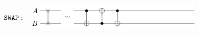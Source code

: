 \documentclass[a4paper,12pt,fleqn]{article}
\newcommand\swap{\mathtt{SWAP}}
\begin{document}
\begin{figure}
  \begin{equation}\label{swap}
    \swap : \ \raisebox{-5mm}{
      \begin{tikzpicture}[scale=1.200000,x=1pt,y=1pt]
\filldraw[color=white] (0.000000, -7.500000) rectangle (180.000000, 22.500000);
\draw[color=black] (0.000000,15.000000) -- (180.000000,15.000000);
\draw[color=black] (0.000000,15.000000) node[left] {$A$};
\draw[color=black] (0.000000,0.000000) -- (180.000000,0.000000);
\draw[color=black] (0.000000,0.000000) node[left] {$B$};
\draw (9.000000,15.000000) -- (9.000000,0.000000);
\begin{scope}
\draw (6.878680, 12.878680) -- (11.121320, 17.121320);
\draw (6.878680, 17.121320) -- (11.121320, 12.878680);
\end{scope}
\begin{scope}
\draw (6.878680, -2.121320) -- (11.121320, 2.121320);
\draw (6.878680, 2.121320) -- (11.121320, -2.121320);
\end{scope}
\draw[fill=white,color=white] (24.000000, -6.000000) rectangle (39.000000, 21.000000);
\draw (31.500000, 7.500000) node {$\sim$};
\draw (54.000000,15.000000) -- (54.000000,0.000000);
\begin{scope}
\draw[fill=white] (54.000000, 0.000000) circle(3.000000pt);
\clip (54.000000, 0.000000) circle(3.000000pt);
\draw (51.000000, 0.000000) -- (57.000000, 0.000000);
\draw (54.000000, -3.000000) -- (54.000000, 3.000000);
\end{scope}
\filldraw (54.000000, 15.000000) circle(1.500000pt);
\draw (72.000000,15.000000) -- (72.000000,0.000000);
\begin{scope}
\draw[fill=white] (72.000000, 15.000000) circle(3.000000pt);
\clip (72.000000, 15.000000) circle(3.000000pt);
\draw (69.000000, 15.000000) -- (75.000000, 15.000000);
\draw (72.000000, 12.000000) -- (72.000000, 18.000000);
\end{scope}
\filldraw (72.000000, 0.000000) circle(1.500000pt);
\draw (90.000000,15.000000) -- (90.000000,0.000000);
\begin{scope}
\draw[fill=white] (90.000000, 0.000000) circle(3.000000pt);
\clip (90.000000, 0.000000) circle(3.000000pt);
\draw (87.000000, 0.000000) -- (93.000000, 0.000000);
\draw (90.000000, -3.000000) -- (90.000000, 3.000000);
\end{scope}
\filldraw (90.000000, 15.000000) circle(1.500000pt);

\end{tikzpicture}}
\end{equation}
\end{figure}
\end{document}

